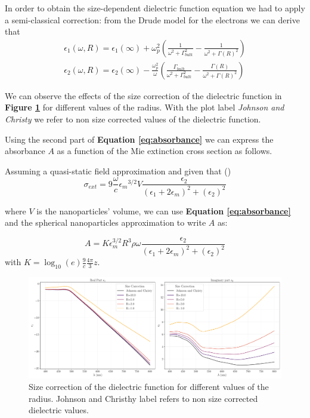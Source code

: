 \documentclass[twocolumn]{article}
\begin{document}
\begin{multicols}{2}
\noindent
In order to obtain the size-dependent dielectric function equation we had to apply a semi-classical correction: from the Drude model for the electrons we can derive that
$$
\begin{array}{l}
\epsilon_{1}(\omega, R)=\epsilon_{1}(\infty)+\omega_{p}^{2}\left(\frac{1}{\omega^{2}+\Gamma_{bulk}^{2}}-\frac{1}{\omega^{2}+\Gamma(R)^{2}}\right) \\
\epsilon_{2}(\omega, R)=\epsilon_{2}(\infty)-\frac{\omega_{p}^{2}}{\omega}\left(\frac{\Gamma_{bulk}}{\omega^{2}+\Gamma_{bulk}^{2}}-\frac{\Gamma(R)}{\omega^{2}+\Gamma(R)^{2}}\right)
\end{array}
$$

\noindent
We can observe the effects of the size correction of the dielectric function in \textbf{Figure \ref{fig:size_correction}} for different values of the radius. With the plot label \textit{Johnson and Christy} we refer to non size corrected values of the dielectric function.

Using the second part of \textbf{Equation \ref{eq:absorbance}} we can express the absorbance $A$ as a function of the Mie extinction cross section as follows.

\noindent
Assuming a quasi-static field approximation and given that (\cite{Kimling2006})
\begin{equation}
\sigma_{e x t}=9 \frac{\omega}{c} \epsilon_{m}{ }^{3 / 2} {V} \frac{\epsilon_{2}}{\left(\epsilon_{1}+2 \epsilon_{m}\right)^{2}+\left(\epsilon_{2}\right)^{2}}
\end{equation}

\noindent
where $V$ is the nanoparticles' volume, we can use \textbf{Equation \ref{eq:absorbance}} and the spherical nanoparticles approximation to write $A$ as:

\begin{equation}
    A=K\epsilon_m^{3/2}R^3\rho\omega\frac{\epsilon_2}{(\epsilon_1 + 2\epsilon_m)^2 + (\epsilon_2)^2}
    \label{eq:ass}
\end{equation}
with $K=\log_{10}(e)\frac{9}{c}\frac{4\pi}{3}z$.

\end{multicols}

\begin{figure}[H]
    \begin{minipage}[l]{1.0\columnwidth}
    \centering
    \includegraphics[width=\textwidth]{image/data/size_correction.pdf}
    \caption{Size correction of the dielectric function for different values of the radius. Johnson and Christhy label refers to non size corrected dielectric values.}
    \label{fig:size_correction}
    \end{minipage}
\end{figure}
\end{document}
